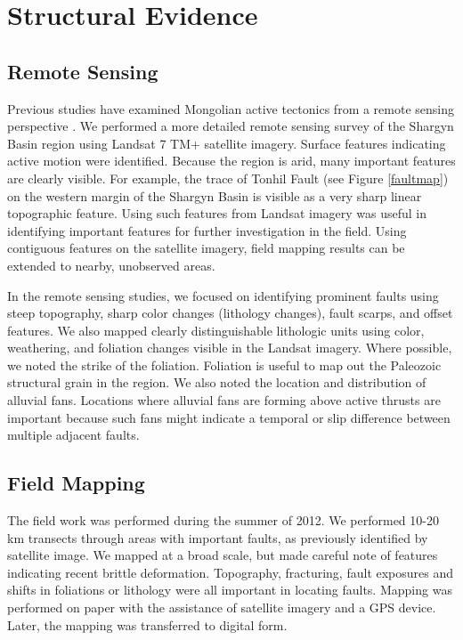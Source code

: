 \section{Structural Evidence}
\subsection{Remote Sensing}
Previous studies have examined Mongolian active tectonics from a remote sensing perspective \citep{Cunningham2005a}\citep{Cunningham2010}\citep{Tapponnier1979}\citep{Walker2007}. We performed a more detailed remote sensing survey of the Shargyn Basin region using Landsat 7 TM+ satellite imagery. Surface features indicating active motion were identified. Because the region is arid, many important features are clearly visible. For example, the trace of Tonhil Fault (see Figure \ref{faultmap}) on the western margin of the Shargyn Basin is visible as a very sharp linear topographic feature. Using such features from Landsat imagery was useful in identifying important features for further investigation in the field. Using contiguous features on the satellite imagery, field mapping results can be extended to nearby, unobserved areas.

In the remote sensing studies, we focused on identifying prominent faults using steep topography, sharp color changes (lithology changes), fault scarps, and offset features. We also mapped clearly distinguishable lithologic units using color, weathering, and foliation changes visible in the Landsat imagery. Where possible, we noted the strike of the foliation. Foliation is useful to map out the Paleozoic structural grain in the region. We also noted the location and distribution of alluvial fans. Locations where alluvial fans are forming above active thrusts are important because such fans might indicate a temporal or slip difference between multiple adjacent faults.

\subsection{Field Mapping}
The field work was performed during the summer of 2012. We performed 10-20 km transects through areas with important faults, as previously identified by satellite image. We mapped at a broad scale, but made careful note of features indicating recent brittle deformation. Topography, fracturing, fault exposures and shifts in foliations or lithology were all important in locating faults.  Mapping was performed on paper with the assistance of satellite imagery and a GPS device. Later, the mapping was transferred to digital form.

